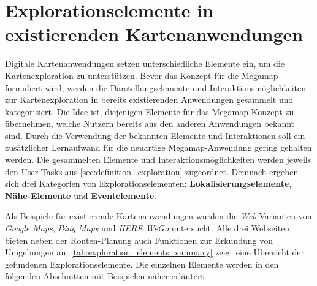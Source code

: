 \section{Explorationselemente in existierenden Kartenanwendungen}
\label{sec:exploration_elements}
Digitale Kartenanwendungen setzen unterschiedliche Elemente ein, um die Kartenexploration zu unterstützen.
Bevor das Konzept für die Megamap formuliert wird, werden die Darstellungselemente und Interaktionsmöglichkeiten zur Kartenexploration in bereits existierenden Anwendungen gesammelt und kategorisiert.
Die Idee ist, diejenigen Elemente für das Megamap-Konzept zu übernehmen, welche Nutzern bereits aus den anderen Anwendungen bekannt sind.
Durch die Verwendung der bekannten Elemente und Interaktionen soll ein zusätzlicher Lernaufwand für die neuartige Megamap-Anwendung gering gehalten werden.
Die gesammelten Elemente und Interaktionsmöglichkeiten werden jeweils den User Tasks aus \autoref{sec:definition_exploration} zugeordnet.
Demnach ergeben sich drei Kategorien von Explorationselementen: \textbf{Lokalisierungselemente}, \textbf{Nähe-Elemente} und \textbf{Eventelemente}.

Als Beispiele für existierende Kartenanwendungen wurden die \emph{Web}-Varianten von \emph{Google Maps}, \emph{Bing Maps} \parencite{Microsoft2018b} und \emph{HERE WeGo} \parencite{HERE2018} untersucht.
Alle drei Webseiten bieten neben der Routen-Planung auch Funktionen zur Erkundung von Umgebungen an.
\autoref{tab:exploration_elements_summary} zeigt eine Übersicht der gefundenen Explorationselemente.
Die einzelnen Elemente werden in den folgenden Abschnitten mit Beispielen näher erläutert.

